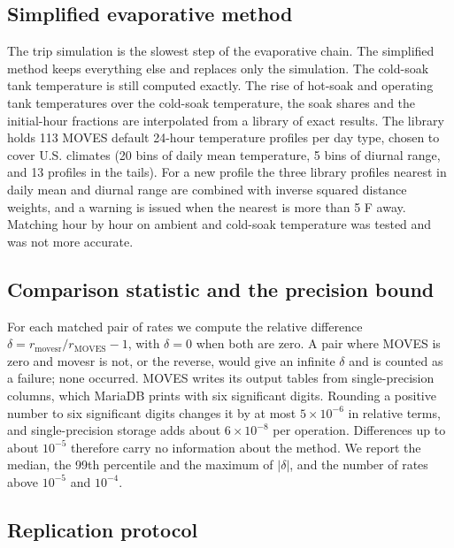 \documentclass[preprint,
3p]{elsarticle} %
\begin{document}
\subsection{\texorpdfstring{Simplified evaporative method
\label{sec:simple}}{Simplified evaporative method }}\label{simplified-evaporative-method}

The trip simulation is the slowest step of the evaporative chain. The
simplified method keeps everything else and replaces only the
simulation. The cold-soak tank temperature is still computed exactly.
The rise of hot-soak and operating tank temperatures over the cold-soak
temperature, the soak shares and the initial-hour fractions are
interpolated from a library of exact results. The library holds 113
MOVES default 24-hour temperature profiles per day type, chosen to cover
U.S. climates (20 bins of daily mean temperature, 5 bins of diurnal
range, and 13 profiles in the tails). For a new profile the three
library profiles nearest in daily mean and diurnal range are combined
with inverse squared distance weights, and a warning is issued when the
nearest is more than 5 F away. Matching hour by hour on ambient and
cold-soak temperature was tested and was not more accurate.

\subsection{Comparison statistic and the precision
bound}\label{comparison-statistic-and-the-precision-bound}

For each matched pair of rates we compute the relative difference
\(\delta = r_{\mathrm{movesr}}/r_{\mathrm{MOVES}} - 1\), with
\(\delta = 0\) when both are zero. A pair where MOVES is zero and movesr
is not, or the reverse, would give an infinite \(\delta\) and is counted
as a failure; none occurred. MOVES writes its output tables from
single-precision columns, which MariaDB prints with six significant
digits. Rounding a positive number to six significant digits changes it
by at most \(5\times10^{-6}\) in relative terms, and single-precision
storage adds about \(6\times10^{-8}\) per operation. Differences up to
about \(10^{-5}\) therefore carry no information about the method. We
report the median, the 99th percentile and the maximum of \(|\delta|\),
and the number of rates above \(10^{-5}\) and \(10^{-4}\).

\subsection{Replication protocol}\label{replication-protocol}
\end{document}
